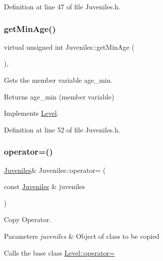 Definition at line 47 of file Juveniles.\+h.

\hypertarget{class_juveniles_a033b591527e3398a05da40e5ab954b40}{}\label{class_juveniles_a033b591527e3398a05da40e5ab954b40} 
\subsubsection{\texorpdfstring{get\+Min\+Age()}{getMinAge()}}
{\footnotesize\ttfamily virtual unsigned int Juveniles\+::get\+Min\+Age (\begin{DoxyParamCaption}{ }\end{DoxyParamCaption})\hspace{0.3cm}{\ttfamily [inline]}, {\ttfamily [virtual]}}



Gets the member variable age\+\_\+min. 

\begin{DoxyReturn}{Returns}
age\+\_\+min (member variable) 
\end{DoxyReturn}


Implements \hyperlink{class_level_a161cf8c238fd499c112d90504cb6f587}{Level}.



Definition at line 52 of file Juveniles.\+h.

\hypertarget{class_juveniles_ac08c2dbd72b4ffeb33de675fd4a8d411}{}\label{class_juveniles_ac08c2dbd72b4ffeb33de675fd4a8d411} 
\subsubsection{\texorpdfstring{operator=()}{operator=()}}
{\footnotesize\ttfamily \hyperlink{class_juveniles}{Juveniles}\& Juveniles\+::operator= (\begin{DoxyParamCaption}\item[{const \hyperlink{class_juveniles}{Juveniles} \&}]{juveniles }\end{DoxyParamCaption})\hspace{0.3cm}{\ttfamily [inline]}}



Copy Operator. 


\begin{DoxyParams}{Parameters}
{\em juveniles} & Object of class to be copied\\
\hline
\end{DoxyParams}
Calls the base class \hyperlink{class_level_a60eb04b65c900ae8dddf3d6251fac7b1}{Level\+::operator=} 

